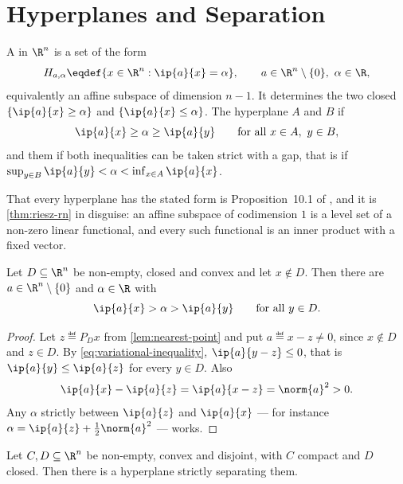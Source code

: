 \section{Hyperplanes and Separation}\label{sec:cvx-separation}

\begin{definition}\label{def:hyperplane}
	A  in $\R^n$ is a set of the form
	\[
		H_{a,\alpha}\eqdef\{x\in\R^n : \ip{a}{x}=\alpha\},
		\qquad a\in\R^n\setminus\{0\},\ \alpha\in\R,
	\]
	equivalently an affine subspace of dimension $n-1$. It determines the two
	closed  $\{\ip{a}{x}\geq\alpha\}$ and
	$\{\ip{a}{x}\leq\alpha\}$. The hyperplane  $A$ and $B$ if
	\[
		\ip{a}{x}\geq\alpha\geq\ip{a}{y}\qquad\text{for all }x\in A,\ y\in B,
	\]
	and  them if both inequalities can
	be taken strict with a gap, that is if $\sup_{y\in B}\ip{a}{y}<\alpha<
		\inf_{x\in A}\ip{a}{x}$.
\end{definition}

That every hyperplane has the stated form is Proposition~10.1 of
\textcite[p.~334]{fukuda2026notes}, and it is \autoref{thm:riesz-rn} in
disguise: an affine subspace of codimension $1$ is a level set of a non-zero
linear functional, and every such functional is an inner product with a fixed
vector.

\begin{lemma}\label{lem:point-separation}
	Let $D\subseteq\R^n$ be non-empty, closed and convex and let $x\notin D$. Then
	there are $a\in\R^n\setminus\{0\}$ and $\alpha\in\R$ with
	\[
		\ip{a}{x}>\alpha>\ip{a}{y}\qquad\text{for all }y\in D .
	\]
\end{lemma}

\begin{proof}
	Let $z\eqdef P_Dx$ from \autoref{lem:nearest-point} and put
	$a\eqdef x-z\neq0$, since $x\notin D$ and $z\in D$. By
	\eqref{eq:variational-inequality}, $\ip{a}{y-z}\leq0$, that is
	$\ip{a}{y}\leq\ip{a}{z}$ for every $y\in D$. Also
	\[
		\ip{a}{x}-\ip{a}{z}=\ip{a}{x-z}=\norm{a}^2>0 .
	\]
	Any $\alpha$ strictly between $\ip{a}{z}$ and $\ip{a}{x}$ --- for instance
	$\alpha=\ip{a}{z}+\tfrac12\norm{a}^2$ --- works.
\end{proof}

\begin{theorem}\label{thm:separation-2}
	Let $C,D\subseteq\R^n$ be non-empty, convex and disjoint, with $C$ compact and
	$D$ closed. Then there is a hyperplane strictly separating them.
\end{theorem}

